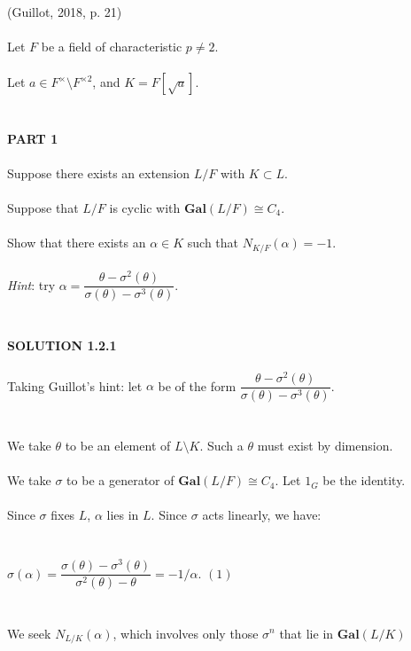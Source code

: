 \documentclass{article}
\begin{document}
 \indent (Guillot, 2018, p. 21) \\\\
\indent Let $F$ be a field of characteristic $p \neq 2$. \\\\
\indent Let $a \in F^\times{\setminus}F^{\times2}$, and $K = F[\sqrt{a}]$. \\\\
\\
\textbf{PART 1} \\\\
\indent Suppose there exists an extension $L/F$ with $K \subset L$. \\\\
\indent Suppose that $L/F$ is cyclic with $\textbf{Gal}(L/F) \cong C_4$. \\\\
\indent Show that there exists an $\alpha \in K$ such that $N_{K/F}(\alpha) = -1$. \\\\
\indent \emph{Hint}: try $\alpha = \dfrac{\theta - \sigma^2(\theta)}{\sigma(\theta) - \sigma^3(\theta)}$. \\\\
\\
\textbf{SOLUTION 1.2.1} \\\\
Taking Guillot's hint: let $\alpha$ be of the form $\dfrac{\theta - \sigma^2(\theta)}{\sigma(\theta) - \sigma^3(\theta)}$. \\\\\\
We take $\theta$ to be an element of $L\setminus K$. Such a $\theta$ must exist by dimension. \\\\
We take $\sigma$ to be a generator of $\textbf{Gal}(L/F) \cong C_4$. Let $1_G$ be the identity. \\\\
Since $\sigma$ fixes $L$, $\alpha$ lies in $L$. Since $\sigma$ acts linearly, we have: \\\\\\
\indent $\sigma(\alpha) = \dfrac{\sigma(\theta) - \sigma^3(\theta)}{\sigma^2(\theta) - \theta} = -1/\alpha$. \indent $(1)$ \\\\\\
We seek $N_{L/K}(\alpha)$, which involves only those  $\sigma^n$ that lie in $\textbf{Gal}(L/K)$ \\\\
\end{document}
